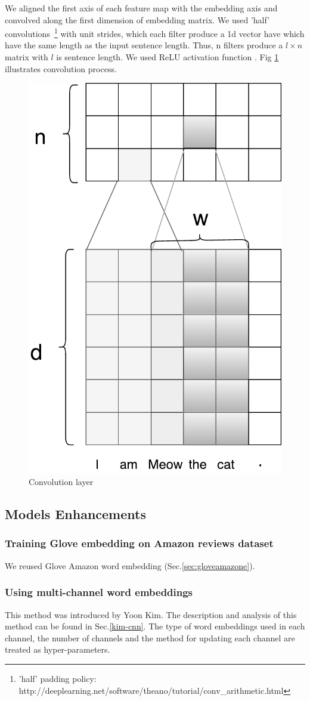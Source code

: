 We aligned the first axis of each feature map with the embedding axis and convolved along the first dimension of embedding matrix. 
We used 'half' convolutions~\footnote{'half' padding policy: http://deeplearning.net/software/theano/tutorial/conv\_arithmetic.html} with unit strides, which each filter produce a 1d vector have which have the same length as the input sentence length. 
Thus, n filters produce a $l \times n$ matrix with $l$ is sentence length. 
We used ReLU activation function \cite{hahnloser2000digital}. Fig \ref{fig:convlayer} illustrates convolution process. 



\begin{figure}[H]
    \centering
    \includegraphics[width=0.4\linewidth]{figure/convlayer}
    \caption[Convolution layer]{Convolution layer}
    \label{fig:convlayer}
\end{figure}

\subsection{Models Enhancements}\label{sec:model-enhan}
\subsubsection{Training Glove embedding on Amazon reviews dataset}\label{sec:reuse-glove-amazon}
We reused Glove Amazon word embedding (Sec.\ref{sec:gloveamazone}).

\subsubsection{Using multi-channel word embeddings}\label{sec:enhan-multi-channel}
This method was introduced by Yoon Kim\cite{KimCNN}.
The description and analysis of this method can be found in Sec.\ref{kim-cnn}.
The type of word embeddings used in each channel, the number of channels and the method for updating each channel are treated as hyper-parameters.

